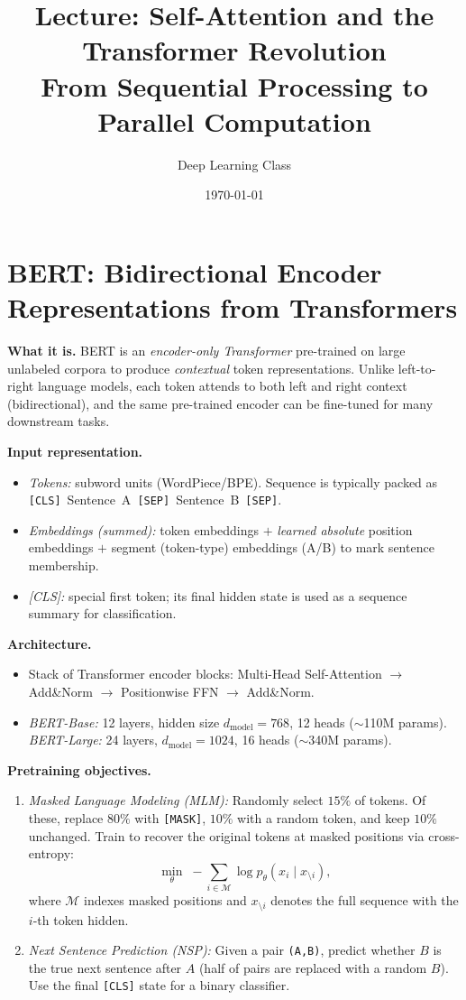 \documentclass{article}
\title{Lecture: Self-Attention and the Transformer Revolution\\
From Sequential Processing to Parallel Computation}
\author{Deep Learning Class}
\date{\today}
\begin{document}
\maketitle

\section{BERT: Bidirectional Encoder Representations from Transformers}\label{sec:bert}
\textbf{What it is.} \;BERT is an \emph{encoder-only Transformer} pre-trained on large unlabeled corpora to produce \emph{contextual} token representations. Unlike left-to-right language models, each token attends to both left and right context (bidirectional), and the same pre-trained encoder can be fine-tuned for many downstream tasks.

\medskip
\noindent\textbf{Input representation.}
\begin{itemize}
  \item \emph{Tokens:} subword units (WordPiece/BPE). Sequence is typically packed as \texttt{[CLS]}~Sentence~A~\texttt{[SEP]}~Sentence~B~\texttt{[SEP]}.
  \item \emph{Embeddings (summed):} token embeddings $+$ \emph{learned absolute} position embeddings $+$ segment (token-type) embeddings (A/B) to mark sentence membership.
  \item \emph{[CLS]:} special first token; its final hidden state is used as a sequence summary for classification.
\end{itemize}

\noindent\textbf{Architecture.}
\begin{itemize}
  \item Stack of Transformer encoder blocks: Multi-Head Self-Attention $\rightarrow$ Add\&Norm $\rightarrow$ Positionwise FFN $\rightarrow$ Add\&Norm.
  \item \emph{BERT-Base:} 12 layers, hidden size $d_{\text{model}}=768$, 12 heads ($\sim$110M params). \quad
        \emph{BERT-Large:} 24 layers, $d_{\text{model}}=1024$, 16 heads ($\sim$340M params).
\end{itemize}

\noindent\textbf{Pretraining objectives.}
\begin{enumerate}
  \item \emph{Masked Language Modeling (MLM):} Randomly select $15\%$ of tokens. Of these, replace $80\%$ with \texttt{[MASK]}, $10\%$ with a random token, and keep $10\%$ unchanged. Train to recover the original tokens at masked positions via cross-entropy:
  \[
    \min_{\theta}\; -\sum_{i\in \mathcal{M}} \log p_{\theta}\!\left(x_i \mid x_{\setminus i}\right),
  \]
  where $\mathcal{M}$ indexes masked positions and $x_{\setminus i}$ denotes the full sequence with the $i$-th token hidden.
  \item \emph{Next Sentence Prediction (NSP):} Given a pair \texttt{(A,B)}, predict whether $B$ is the true next sentence after $A$ (half of pairs are replaced with a random $B$). Use the final \texttt{[CLS]} state for a binary classifier.
\end{enumerate}
\end{document}
